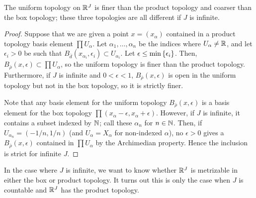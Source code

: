 \documentclass[10pt]{report}
\begin{document}
\begin{theorem}
  The uniform topology on $\mathbb{R}^J$ is finer than the product topology and coarser than the box topology;
  these three topologies are all different if $J$ is infinite.
\end{theorem}
\begin{proof}
  Suppose that we are given a point $x = (x_\alpha)$ contained in a product topology basis element $\prod U_\alpha$.
  Let $\alpha_1,\dots,\alpha_n$ be the indices where $U_\alpha \neq \mathbb{R}$, and let $\epsilon_i > 0$ be such that $B_{\bar d}(x_{\alpha_i},\epsilon_i) \subset U_{\alpha_i}$.
  Let $\epsilon \leq \min \left\{ \epsilon_i \right\}$.
  Then, $B_{\bar \rho}(x,\epsilon) \subset \prod U_\alpha$, so the uniform topology is finer than the product topology.
  Furthermore, if $J$ is infinite and $0 < \epsilon < 1$, $B_{\bar \rho}(x,\epsilon)$ is open in the uniform topology but not in the box topology, so it is strictly finer.

  Note that any basis element for the uniform topology $B_{\bar \rho}(x,\epsilon)$ is a basis element for the box topology $\prod (x_\alpha - \epsilon,x_\alpha + \epsilon)$.
  However, if $J$ is infinite, it contains a subset indexed by $\mathbb{N}$; call these $\alpha_n$ for $n \in \mathbb{N}$.
  Then, if $U_{\alpha_n} = (-1/n,1/n)$ (and $U_\alpha = X_\alpha$ for non-indexed $\alpha$), no $\epsilon > 0$ gives a $B_{\bar \rho}(x,\epsilon)$ contained in $\prod U_\alpha$ by the Archimedian property.
  Hence the inclusion is strict for infinite $J$.
\end{proof}

In the case where $J$ is infinite, we want to know whether $\mathbb{R}^J$ is metrizable in either the box or product topology.
It turns out this is only the case when $J$ is countable and $\mathbb{R}^J$ has the product topology.
\end{document}
